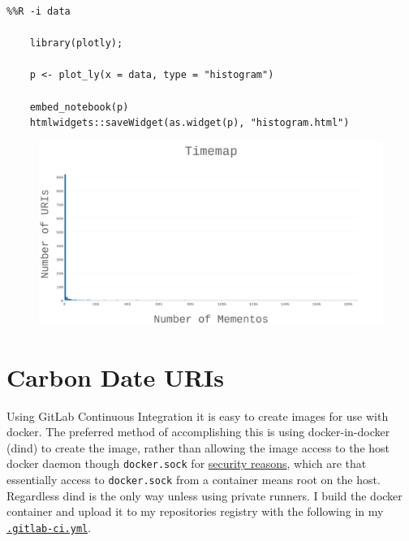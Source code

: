 \documentclass[12pt, a4paper]{article}
\newcommand{\code}[1]{\texttt{#1}}
\begin{document}
\begin{minipage}{\linewidth} %
\vspace{2em}
\begin{verbatim}
%%R -i data

    library(plotly);

    p <- plot_ly(x = data, type = "histogram")

    embed_notebook(p)
    htmlwidgets::saveWidget(as.widget(p), "histogram.html")
\end{verbatim}
\vspace{2em}
\end{minipage}

\begin{figure}[h]
    \centering
    \includegraphics[width=\textwidth]{dia/timemap.png}
\end{figure}

%
%
\newpage
\section{Carbon Date URIs}
Using GitLab Continuous Integration it is easy to create images for use
with docker. The preferred method of accomplishing this is using
docker-in-docker (dind) to create the image, rather than allowing the image
access to the host docker daemon though \code{docker.sock} for
\href{https://www.youtube.com/watch?v=CB9Aa6QeRaI&feature=youtu.be}{security reasons},
which are that essentially access to \code{docker.sock} from a
container means root on the host. Regardless dind is the only way
unless using private runners. I build the docker container and
upload it to my repositories registry with the following in my
\href{https://gitlab.com/datenstrom/cs532-s17/blob/master/.gitlab-ci.yml}{\code{.gitlab-ci.yml}}.
\end{document}
